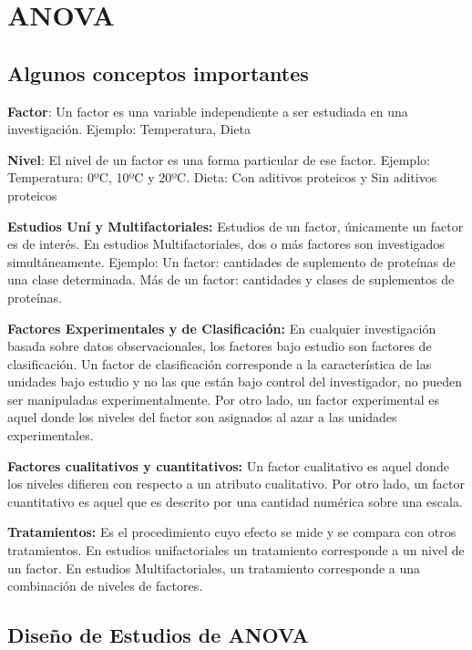 \documentclass[]{book}
\theoremstyle{definition}
\theoremstyle{definition}
\theoremstyle{definition}
\theoremstyle{remark}
\begin{document}
\hypertarget{anova}{%
\chapter{ANOVA}\label{anova}}

\hypertarget{algunos-conceptos-importantes}{%
\section{Algunos conceptos
importantes}\label{algunos-conceptos-importantes}}

\textbf{Factor}: Un factor es una variable independiente a ser estudiada
en una investigación. Ejemplo: Temperatura, Dieta

\textbf{Nivel}: El nivel de un factor es una forma particular de ese
factor. Ejemplo: Temperatura: 0ºC, 10ºC y 20ºC. Dieta: Con aditivos
proteicos y Sin aditivos proteicos

\textbf{Estudios Uní y Multifactoriales:} Estudios de un factor,
únicamente un factor es de interés. En estudios Multifactoriales, dos o
más factores son investigados simultáneamente. Ejemplo: Un factor:
cantidades de suplemento de proteínas de una clase determinada. Más de
un factor: cantidades y clases de suplementos de proteínas.

\textbf{Factores Experimentales y de Clasificación:} En cualquier
investigación basada sobre datos observacionales, los factores bajo
estudio son factores de clasificación. Un factor de clasificación
corresponde a la característica de las unidades bajo estudio y no las
que están bajo control del investigador, no pueden ser manipuladas
experimentalmente. Por otro lado, un factor experimental es aquel donde
los niveles del factor son asignados al azar a las unidades
experimentales.

\textbf{Factores cualitativos y cuantitativos:} Un factor cualitativo es
aquel donde los niveles difieren con respecto a un atributo cualitativo.
Por otro lado, un factor cuantitativo es aquel que es descrito por una
cantidad numérica sobre una escala.

\textbf{Tratamientos:} Es el procedimiento cuyo efecto se mide y se
compara con otros tratamientos. En estudios unifactoriales un
tratamiento corresponde a un nivel de un factor. En estudios
Multifactoriales, un tratamiento corresponde a una combinación de
niveles de factores.

\hypertarget{diseno-de-estudios-de-anova}{%
\section{Diseño de Estudios de
ANOVA}\label{diseno-de-estudios-de-anova}}
\end{document}
